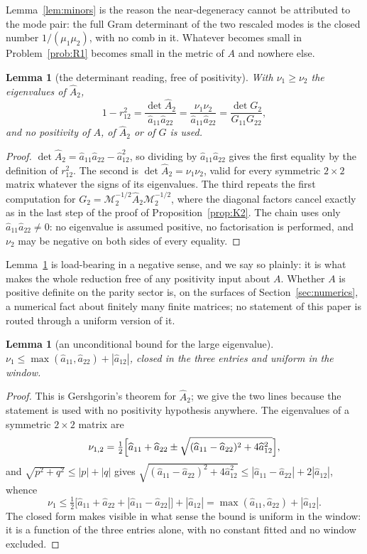 \documentclass[11pt,a4paper]{article}
\theoremstyle{plain}
\newtheorem{lemma}[theorem]{Lemma}
\theoremstyle{definition}
\newcommand{\Ah}{\widehat{A}}
\newcommand{\ah}{\widehat{a}}
\newcommand{\MM}{\mathcal{M}}
\begin{document}
Lemma~\ref{lem:minors} is the reason the near-degeneracy cannot be attributed
to the mode pair: the full Gram determinant of the two rescaled modes is the
closed number $1/(\mu_1\mu_2)$, with no comb in it. Whatever becomes small in
Problem~\ref{prob:R1} becomes small in the metric of $A$ and nowhere else.

\begin{lemma}[the determinant reading, free of positivity]
\label{lem:detread}
With $\nu_1\ge\nu_2$ the eigenvalues of $\Ah_2$,
\begin{equation}
\label{eq:detread}
  1-r_{12}^{2}
  =\frac{\det\Ah_2}{\ah_{11}\ah_{22}}
  =\frac{\nu_1\nu_2}{\ah_{11}\ah_{22}}
  =\frac{\det G_2}{G_{11}G_{22}},
\end{equation}
and no positivity of $A$, of $\Ah_2$ or of $G$ is used.
\end{lemma}

\begin{proof}
$\det\Ah_2=\ah_{11}\ah_{22}-\ah_{12}^{2}$, so dividing by $\ah_{11}\ah_{22}$
gives the first equality by the definition of $r_{12}^{2}$. The second is
$\det\Ah_2=\nu_1\nu_2$, valid for every symmetric $2\times2$ matrix whatever
the signs of its eigenvalues. The third repeats the first computation for
$G_2=\MM_2^{-1/2}\Ah_2\MM_2^{-1/2}$, where the diagonal factors cancel exactly
as in the last step of the proof of Proposition~\ref{prop:K2}. The chain uses
only $\ah_{11}\ah_{22}\ne0$: no eigenvalue is assumed positive, no
factorisation is performed, and $\nu_2$ may be negative on both sides of every
equality.
\end{proof}

Lemma~\ref{lem:detread} is load-bearing in a negative sense, and we say so
plainly: it is what makes the whole reduction free of any positivity input about
$A$. Whether $A$ is positive definite on the parity sector is, on the surfaces
of Section~\ref{sec:numerics}, a numerical fact about finitely many finite
matrices; no statement of this paper is routed through a uniform version of it.

\begin{lemma}[an unconditional bound for the large eigenvalue]
\label{lem:gershgorin}
$\nu_1\le\max(\ah_{11},\ah_{22})+|\ah_{12}|$, closed in the three entries and
uniform in the window.
\end{lemma}

\begin{proof}
This is Gershgorin's theorem \cite{Gershgorin1931} for $\Ah_2$; we give the two
lines because the statement is used with no positivity hypothesis anywhere. The
eigenvalues of a symmetric $2\times2$ matrix are
\[
  \nu_{1,2}=\tfrac12\Bigl[\ah_{11}+\ah_{22}
  \pm\sqrt{(\ah_{11}-\ah_{22})^{2}+4\ah_{12}^{2}}\Bigr],
\]
and $\sqrt{p^{2}+q^{2}}\le|p|+|q|$ gives
$\sqrt{(\ah_{11}-\ah_{22})^{2}+4\ah_{12}^{2}}\le|\ah_{11}-\ah_{22}|
+2|\ah_{12}|$, whence
\[
  \nu_1\le\tfrac12\bigl[\ah_{11}+\ah_{22}+|\ah_{11}-\ah_{22}|\bigr]+|\ah_{12}|
  =\max(\ah_{11},\ah_{22})+|\ah_{12}| .
\]
The closed form makes visible in what sense the bound is uniform in the window:
it is a function of the three entries alone, with no constant fitted and no
window excluded.
\end{proof}
\end{document}
